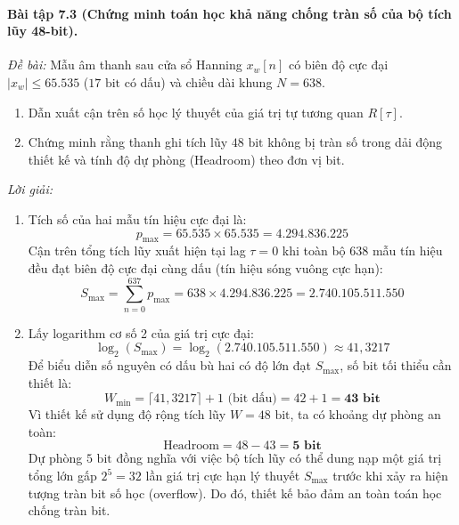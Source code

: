 \paragraph{Bài tập 7.3 (Chứng minh toán học khả năng chống tràn số của bộ tích lũy 48-bit).}
\textit{Đề bài:} Mẫu âm thanh sau cửa sổ Hanning $x_w[n]$ có biên độ cực đại $|x_w| \le 65.535$ ($17\text{ bit}$ có dấu) và chiều dài khung $N = 638$.
\begin{enumerate}[label=(\alph*), itemsep=2pt]
    \item Dẫn xuất cận trên số học lý thuyết của giá trị tự tương quan $R[\tau]$.
    \item Chứng minh rằng thanh ghi tích lũy $48\text{ bit}$ không bị tràn số trong dải động thiết kế và tính độ dự phòng (Headroom) theo đơn vị bit.
\end{enumerate}

\textit{Lời giải:}
\begin{enumerate}[label=(\alph*), itemsep=2pt]
    \item Tích số của hai mẫu tín hiệu cực đại là:
    \begin{equation}
    p_{\max} = 65.535 \times 65.535 = 4.294.836.225
    \end{equation}
    Cận trên tổng tích lũy xuất hiện tại lag $\tau = 0$ khi toàn bộ 638 mẫu tín hiệu đều đạt biên độ cực đại cùng dấu (tín hiệu sóng vuông cực hạn):
    \begin{equation}
    S_{\max} = \sum_{n=0}^{637} p_{\max} = 638 \times 4.294.836.225 = \mathbf{2.740.105.511.550}
    \end{equation}
    
    \item Lấy logarithm cơ số 2 của giá trị cực đại:
    \begin{equation}
    \log_2(S_{\max}) = \log_2(2.740.105.511.550) \approx 41{,}3217
    \end{equation}
    Để biểu diễn số nguyên có dấu bù hai có độ lớn đạt $S_{\max}$, số bit tối thiểu cần thiết là:
    \begin{equation}
    W_{\text{min}} = \lceil 41{,}3217 \rceil + 1\text{ (bit dấu)} = 42 + 1 = \mathbf{43\text{ bit}}
    \end{equation}
    Vì thiết kế sử dụng độ rộng tích lũy $W = 48\text{ bit}$, ta có khoảng dự phòng an toàn:
    \begin{equation}
    \text{Headroom} = 48 - 43 = \mathbf{5\text{ bit}}
    \end{equation}
    Dự phòng $5\text{ bit}$ đồng nghĩa với việc bộ tích lũy có thể dung nạp một giá trị tổng lớn gấp $2^5 = 32$ lần giá trị cực hạn lý thuyết $S_{\max}$ trước khi xảy ra hiện tượng tràn bit số học (overflow). Do đó, thiết kế bảo đảm an toàn toán học chống tràn bit.
\end{enumerate}

